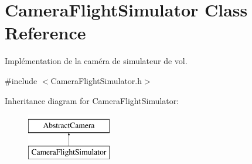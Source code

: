 \hypertarget{classCameraFlightSimulator}{\section{Camera\-Flight\-Simulator Class Reference}
\label{classCameraFlightSimulator}
}


Implémentation de la caméra de simulateur de vol.  




{\ttfamily \#include $<$Camera\-Flight\-Simulator.\-h$>$}

Inheritance diagram for Camera\-Flight\-Simulator\-:\begin{figure}[H]
\begin{center}
\leavevmode
\includegraphics[height=2.000000cm]{classCameraFlightSimulator}
\end{center}
\end{figure}
